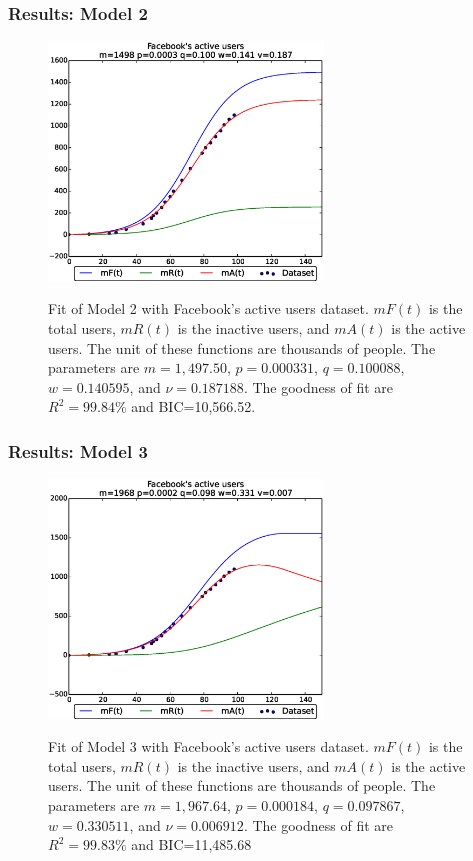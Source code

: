 \documentclass{beamer}
\begin{document}
\begin{frame}
\frametitle{Results: Model 2}
\begin{figure}
	\centering
	{\includegraphics*[scale=0.9,width=0.65\textwidth]{images03/fb-model2-1.eps}}
	\caption{Fit of Model 2 with Facebook's active users dataset.\label{fig:model2fit}
		{$mF(t)$ is the total users, $mR(t)$ is the inactive users, and $mA(t)$ is the active users. The unit of these functions are thousands of people. The parameters are $m=1,497.50$, $p=0.000331$, $q=0.100088$, $w=0.140595$, and $\nu=0.187188$. The goodness of fit are $R^2=99.84\%$ and BIC=10,566.52.}}
\end{figure}
\end{frame}


\begin{frame}
\frametitle{Results: Model 3}
\begin{figure}
	\centering
	{\includegraphics*[scale=0.9,width=0.65\textwidth]{images03/fb-model3-1.eps}}
	\caption{Fit of Model 3 with Facebook's active users dataset.\label{fig:model3fit}
		{$mF(t)$ is the total users, $mR(t)$ is the inactive users, and $mA(t)$ is the active users. The unit of these functions are thousands of people. The parameters are $m=1,967.64$, $p=0.000184$, $q=0.097867$, $w=0.330511$, and $\nu=0.006912$. The goodness of fit are $R^2=99.83\%$ and BIC=11,485.68}}
\end{figure}
\end{frame}
\end{document}
